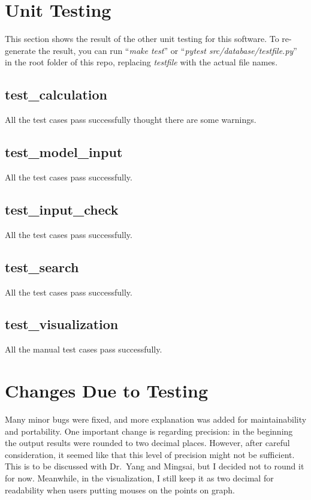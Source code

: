 \documentclass[12pt, titlepage]{article}
\begin{document}
\section{Unit Testing}\label{UT}
This section shows the result of the other unit testing for this software. To re-generate the result, you can run ``\textit{make test}'' or ``\textit{pytest src/database/testfile.py}'' in the root folder of this repo, replacing \textit{testfile} with the actual file names. 

\subsection{test\_calculation}
All the test cases pass successfully thought there are some warnings.


\subsection{test\_model\_input}
All the test cases pass successfully.


\subsection{test\_input\_check}
All the test cases pass successfully.

\subsection{test\_search}
All the test cases pass successfully.
\subsection{test\_visualization}
All the manual test cases pass successfully.

\section{Changes Due to Testing}

Many minor bugs were fixed, and more explanation was added for maintainability and portability. One important change is regarding precision: in the beginning the output results were rounded to two decimal places. However, after careful consideration, it seemed like that this level of precision might not be sufficient. This is to be discussed with Dr.\ Yang and Mingsai, but I decided not to round it for now. Meanwhile, in the visualization, I still keep it as two decimal for readability when users putting mouses on the points on graph.  
\end{document}
